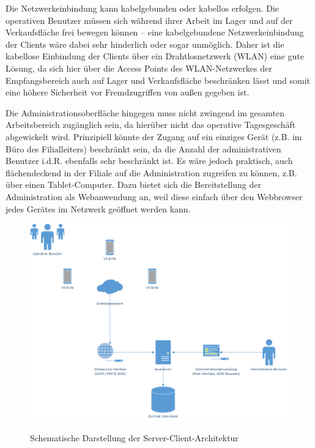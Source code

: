 Die Netzwerkeinbindung kann kabelgebunden oder kabellos erfolgen. Die operativen Benutzer müssen sich während ihrer Arbeit im Lager und auf der Verkaufsfläche frei bewegen können -- eine kabelgebundene Netzwerkeinbindung der Clients wäre dabei sehr hinderlich oder sogar unmöglich. Daher ist die kabellose Einbindung der Clients über ein Drahtlosnetzwerk (\ac{WLAN}) eine gute Lösung, da sich hier über die Access Points des \ac{WLAN}-Netzwerkes der Empfangsbereich auch auf Lager und Verkaufsfläche beschränken lässt und somit eine höhere Sicherheit vor Fremdzugriffen von außen gegeben ist.

Die Administrationsoberfläche hingegen muss nicht zwingend im gesamten Arbeitsbereich zugänglich sein, da hierüber nicht das operative Tagesgeschäft abgewickelt wird. Prinzipiell könnte der Zugang auf ein einziges Gerät (z.B. im Büro des Filialleiters) beschränkt sein, da die Anzahl der administrativen Benutzer i.d.R. ebenfalls sehr beschränkt ist. Es wäre jedoch praktisch, auch flächendeckend in der Filiale auf die Administration zugreifen zu können, z.B. über einen Tablet-Computer. Dazu bietet sich die Bereitstellung der Administration als Webanwendung an, weil diese einfach über den Webbrowser jedes Gerätes im Netzwerk geöffnet werden kann.

\begin{figure}[H]
	\centering
	{\includegraphics[width=\textwidth]{Bilder/Abbildungen/architektur_serverclient.png}}
	\caption{Schematische Darstellung der Server-Client-Architektur}
	\label{fig:architektur_serverclient}
\end{figure}

